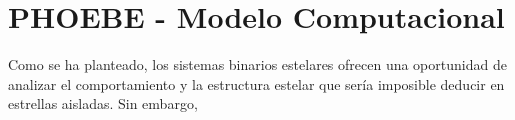 \chapter{PHOEBE - Modelo Computacional}

Como se ha planteado, los sistemas binarios estelares ofrecen una oportunidad de analizar el comportamiento y la estructura estelar que sería imposible deducir en estrellas aisladas. Sin embargo, 